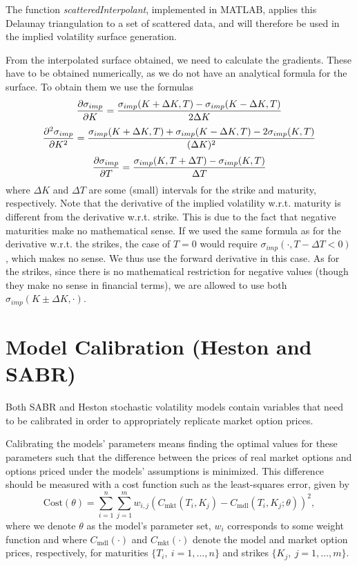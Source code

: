 The function \emph{scatteredInterpolant}, implemented in MATLAB, applies this Delaunay triangulation to a set of scattered data, and will therefore be used in the implied volatility surface generation.


From the interpolated surface obtained, we need to calculate the gradients. These have to be obtained numerically, as we do not have an analytical formula for the surface. To obtain them we use the formulas
\begin{equation}
\pdv{\sigma_{imp}}{K}(K,T)=\frac{\sigma_{imp}(K+\Delta K,T)-\sigma_{imp}(K-\Delta K,T)}{2\Delta K}
\end{equation}
\begin{equation}
\pdv{^2\sigma_{imp}}{K^2}(K,T)=\frac{\sigma_{imp}(K+\Delta K,T)+\sigma_{imp}(K-\Delta K,T)-2\sigma_{imp}(K,T)}{(\Delta K)^2}
\end{equation}
\begin{equation}
\pdv{\sigma_{imp}}{T}(K,T)=\frac{\sigma_{imp}(K,T+\Delta T)-\sigma_{imp}(K,T)}{\Delta T}
\end{equation}
\noindent where $\Delta K$ and $\Delta T$ are some (small) intervals for the strike and maturity, respectively. Note that the derivative of the implied volatility w.r.t. maturity is different from the derivative w.r.t. strike. This is due to the fact that negative maturities make no mathematical sense. If we used the same formula as for the derivative w.r.t. the strikes, the case of $T=0$ would require $\sigma_{imp}(\cdot,T-\Delta T<0)$, which makes no sense. We thus use the forward derivative in this case. As for the strikes, since there is no mathematical restriction for negative values (though they make no sense in financial terms), we are allowed to use both $\sigma_{imp}(K\pm\Delta K,\cdot)$.

 
\section{Model Calibration (Heston and SABR)}
\label{section:Model Calibration}
Both SABR and Heston stochastic volatility models contain variables that need to be calibrated in order to appropriately replicate market option prices.


Calibrating the models' parameters means finding the optimal values for these parameters such that the difference between the prices of real market options and options priced under the models' assumptions is minimized. This difference should be measured with a cost function such as the least-squares error, given by
\begin{equation}
\mathrm{Cost}(\theta)=\sum_{i=1}^n\sum_{j=1}^mw_{i,j}\left(C_{\mathrm{mkt}}(T_i,K_j)-C_{\mathrm{mdl}}(T_i,K_j;\theta)\right)^2,
\end{equation}
\noindent where we denote $\theta$ as the model's parameter set, $w_i$ corresponds to some weight function and where $C_{\mathrm{mdl}}(\cdot)$ and $C_{\mathrm{mkt}}(\cdot)$ denote the model and market option prices, respectively, for maturities $\{T_i,\ i=1,\ldots,n\}$ and strikes $\{K_j,\ j=1,\ldots,m\}$.

